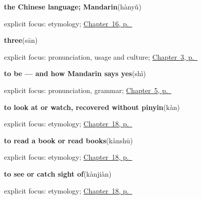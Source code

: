 \noindent\begin{minipage}[t]{\linewidth}
\raggedright
\textbf{the Chinese language; Mandarin}\enspace\emph{}\enspace(hànyǔ)\par
\footnotesize explicit focus: etymology; \hyperref[ch:zh-language-identity]{Chapter~16, p.~\pageref*{ch:zh-language-identity}}
\end{minipage}\par\smallskip

\noindent\begin{minipage}[t]{\linewidth}
\raggedright
\textbf{three}\enspace\emph{}\enspace(sān)\par
\footnotesize explicit focus: pronunciation, usage and culture; \hyperref[ch:zh-numbers]{Chapter~3, p.~\pageref*{ch:zh-numbers}}
\end{minipage}\par\smallskip

\noindent\begin{minipage}[t]{\linewidth}
\raggedright
\textbf{to be — and how Mandarin says yes}\enspace\emph{}\enspace(shì)\par
\footnotesize explicit focus: pronunciation, grammar; \hyperref[ch:zh-shi]{Chapter~5, p.~\pageref*{ch:zh-shi}}
\end{minipage}\par\smallskip

\noindent\begin{minipage}[t]{\linewidth}
\raggedright
\textbf{to look at or watch, recovered without pinyin}\enspace\emph{}\enspace(kàn)\par
\footnotesize explicit focus: etymology; \hyperref[ch:zh-looking-reading]{Chapter~18, p.~\pageref*{ch:zh-looking-reading}}
\end{minipage}\par\smallskip

\noindent\begin{minipage}[t]{\linewidth}
\raggedright
\textbf{to read a book or read books}\enspace\emph{}\enspace(kànshū)\par
\footnotesize explicit focus: etymology; \hyperref[ch:zh-looking-reading]{Chapter~18, p.~\pageref*{ch:zh-looking-reading}}
\end{minipage}\par\smallskip

\noindent\begin{minipage}[t]{\linewidth}
\raggedright
\textbf{to see or catch sight of}\enspace\emph{}\enspace(kànjiàn)\par
\footnotesize explicit focus: etymology; \hyperref[ch:zh-looking-reading]{Chapter~18, p.~\pageref*{ch:zh-looking-reading}}
\end{minipage}\par\smallskip

